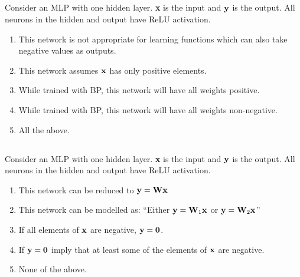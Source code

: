 
\begin{frame}
\section{}
Consider an MLP with one hidden layer. {\bf x} is the input and ${\bf y}$ is the output. All neurons in the hidden and output have ReLU activation.
\begin{enumerate}[label=(\Alph*)]
\item This network is not appropriate for learning functions which can also take negative values as outputs.    %
\item This network assumes ${\bf x}$ has only positive elements.
\item While trained with BP, this network will have all weights positive.
\item While trained with BP, this network will have all weights non-negative.
\item All the above.    %

\end{enumerate}

\end{frame}


\begin{frame}
\section{}
Consider an MLP with one hidden layer. {\bf x} is the input and ${\bf y}$ is the output. All neurons in the hidden and output have ReLU activation.

\begin{enumerate}[label=(\Alph*)]
\item This network can be reduced to ${\bf y} = {\bf W}{\bf x}$
\item This network can be modelled as: ``Either ${\bf y} = {\bf W}_1{\bf x}$ or ${\bf y} = {\bf W}_2{\bf x}$''    %
\item If all elements of ${\bf x}$ are negative, ${\bf y} = {\bf 0}$.
\item If ${\bf y} = {\bf 0}$ imply that at least some of the elements of ${\bf x}$ are negative.
\item None of the above.    %
\end{enumerate}
\end{frame}
